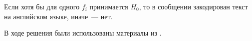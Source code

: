\documentclass[a4paper,10pt]{article}
\begin{document}
Если хотя бы для одного $f_i$ принимается $H_0$, то в сообщении закодирован 
текст на английском языке, иначе~--- нет.

В ходе решения были использованы материалы из \cite{ivchenko1984matstat}.




\pagebreak



\end{document}
